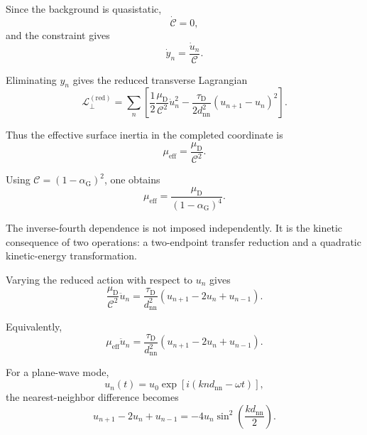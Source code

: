 Since the background is quasistatic,
\begin{equation}
    \dot{\mathcal{C}} = 0,
\end{equation}
and the constraint gives
\begin{equation}
    \dot{y}_n = \frac{\dot{u}_n}{\mathcal{C}}.
\end{equation}

Eliminating $y_n$ gives the reduced transverse Lagrangian
\begin{equation}
    \mathscr{L}_\perp^{(\mathrm{red})} = \sum_n \left[ \frac{1}{2} \frac{\mu_{\mathrm{D}}}{\mathcal{C}^2} \dot{u}_n^2 - \frac{\tau_{\mathrm{D}}}{2d_{\mathrm{nn}}^2} \left(u_{n+1}-u_n\right)^2 \right].
\end{equation}

Thus the effective surface inertia in the completed coordinate is
\begin{equation}
    \mu_{\mathrm{eff}} = \frac{\mu_{\mathrm{D}}}{\mathcal{C}^2}.
\end{equation}

Using $\mathcal{C} = (1-\alpha_{\mathrm{G}})^2$, one obtains
\begin{equation}
    \boxed{ \mu_{\mathrm{eff}} = \frac{\mu_{\mathrm{D}}}{(1-\alpha_{\mathrm{G}})^4} }.
\end{equation}

The inverse-fourth dependence is not imposed independently. It is the kinetic consequence of two operations: a two-endpoint transfer reduction and a quadratic kinetic-energy transformation.

Varying the reduced action with respect to $u_n$ gives
\begin{equation}
    \frac{\mu_{\mathrm{D}}}{\mathcal{C}^2}\ddot{u}_n = \frac{\tau_{\mathrm{D}}}{d_{\mathrm{nn}}^2} \left(u_{n+1}-2u_n+u_{n-1}\right).
\end{equation}

Equivalently,
\begin{equation}
    \mu_{\mathrm{eff}}\ddot{u}_n = \frac{\tau_{\mathrm{D}}}{d_{\mathrm{nn}}^2} \left(u_{n+1}-2u_n+u_{n-1}\right).
\end{equation}

For a plane-wave mode,
\begin{equation}
    u_n(t) = u_0 \exp\left[i(knd_{\mathrm{nn}}-\omega t)\right],
\end{equation}
the nearest-neighbor difference becomes
\begin{equation}
    u_{n+1}-2u_n+u_{n-1} = -4u_n \sin^2\left(\frac{kd_{\mathrm{nn}}}{2}\right).
\end{equation}


